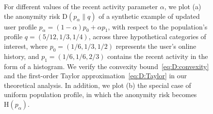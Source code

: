 \begin{figure}[htb]
	\centering
	\hfil
	\caption{For different values of the recent activity parameter $\alpha$, we plot (a) the anonymity risk $\mathrm{D}(p_\alpha\|q)$ of a synthetic example of updated user profile $p_\alpha=(1-\alpha)p_0+\alpha p_1$, with respect to the population's profile $q=(5/12, 1/3, 1/4)$, across three hypothetical categories of interest, where $p_0=(1/6, 1/3, 1/2)$ represents the user's online history, and $p_1=(1/6, 1/6, 2/3)$ contains the recent activity in the form of a histogram. We verify the convexity bound~\eqref{eq:D:convexity} and the first-order Taylor approximation~\eqref{eq:D:Taylor} in our theoretical analysis. In addition, we plot (b) the special case of uniform population profile, in which the anonymity risk becomes $\mathrm{H}(p_\alpha)$.}
	\label{fig:3}
\end{figure}

